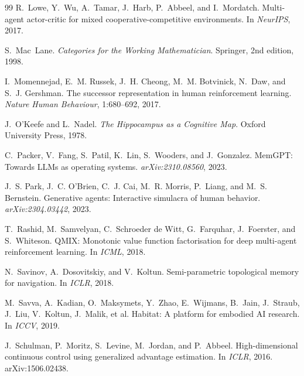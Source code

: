 \documentclass{article}
\begin{document}
\begin{thebibliography}{99}
R.~Lowe, Y.~Wu, A.~Tamar, J.~Harb, P.~Abbeel, and I.~Mordatch.
\newblock Multi-agent actor-critic for mixed cooperative-competitive environments.
\newblock In \emph{NeurIPS}, 2017.

S.~Mac~Lane.
\newblock \emph{Categories for the Working Mathematician}.
\newblock Springer, 2nd edition, 1998.

I.~Momennejad, E.~M. Russek, J.~H. Cheong, M.~M. Botvinick, N.~Daw, and S.~J. Gershman.
\newblock The successor representation in human reinforcement learning.
\newblock \emph{Nature Human Behaviour}, 1:680--692, 2017.

J.~O'Keefe and L.~Nadel.
\newblock \emph{The Hippocampus as a Cognitive Map}.
\newblock Oxford University Press, 1978.

C.~Packer, V.~Fang, S.~Patil, K.~Lin, S.~Wooders, and J.~Gonzalez.
\newblock MemGPT: Towards LLMs as operating systems.
\newblock \emph{arXiv:2310.08560}, 2023.

J.~S. Park, J.~C. O'Brien, C.~J. Cai, M.~R. Morris, P.~Liang, and M.~S. Bernstein.
\newblock Generative agents: Interactive simulacra of human behavior.
\newblock \emph{arXiv:2304.03442}, 2023.

T.~Rashid, M.~Samvelyan, C.~Schroeder de Witt, G.~Farquhar, J.~Foerster, and S.~Whiteson.
\newblock QMIX: Monotonic value function factorisation for deep multi-agent reinforcement learning.
\newblock In \emph{ICML}, 2018.

N.~Savinov, A.~Dosovitskiy, and V.~Koltun.
\newblock Semi-parametric topological memory for navigation.
\newblock In \emph{ICLR}, 2018.

M.~Savva, A.~Kadian, O.~Maksymets, Y.~Zhao, E.~Wijmans, B.~Jain, J.~Straub, J.~Liu, V.~Koltun, J.~Malik, et al.
\newblock Habitat: A platform for embodied AI research.
\newblock In \emph{ICCV}, 2019.

J.~Schulman, P.~Moritz, S.~Levine, M.~Jordan, and P.~Abbeel.
\newblock High-dimensional continuous control using generalized advantage estimation.
\newblock In \emph{ICLR}, 2016.
\newblock arXiv:1506.02438.


\end{thebibliography}
\end{document}
